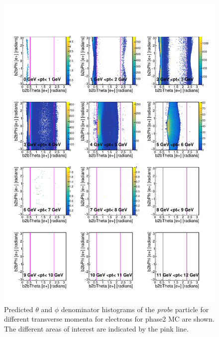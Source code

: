 \documentclass[a4paper,11pt,twosided,final,german,openbib,pdftex,listof=totoc,bibliography=totoc]{scrbook}
\begin{document}
\begin{appendix}
\begin{figure}[h!]
	\includegraphics[width=\textwidth]{Plots/RTPtMemD_MC.pdf}
	\caption[Denominator $\theta$, $\phi$ Electron Transverse Momentum MC]{Predicted $\theta$ and $\phi$ denominator histograms of the \textit{probe} particle for different transverse momenta for electrons for phase2 MC are shown. The different areas of interest are indicated by the pink line.}
	\label{plt:RTPtMemD_MC}
\end{figure}




\end{appendix}
\end{document}
